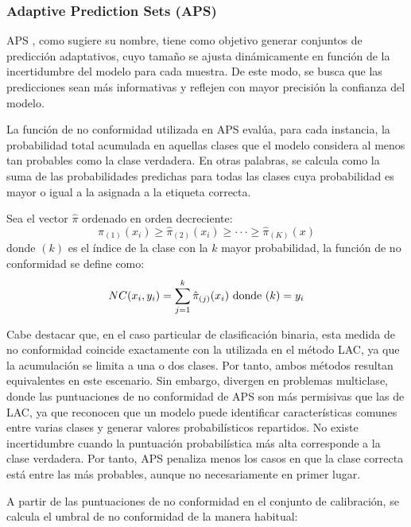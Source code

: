 
\subsubsection{Adaptive Prediction Sets (APS)}

\acrshort{APS} \cite{romano2020}, como sugiere su nombre, tiene como objetivo generar conjuntos de predicción adaptativos, cuyo tamaño se ajusta dinámicamente en función de la incertidumbre del modelo para cada muestra. De este modo, se busca que las predicciones sean más informativas y reflejen con mayor precisión la confianza del modelo.

La función de no conformidad utilizada en \acrshort{APS} evalúa, para cada instancia, la probabilidad total acumulada en aquellas clases que el modelo considera al menos tan probables como la clase verdadera. En otras palabras, se calcula como la suma de las probabilidades predichas para todas las clases cuya probabilidad es mayor o igual a la asignada a la etiqueta correcta.

Sea el vector $\hat{\pi}$ ordenado en orden decreciente: 
$$
\hat{\pi}_{(1)}(x_i) \ge \hat{\pi}_{(2)}(x_i) \ge \cdot\cdot\cdot \ge \hat{\pi}_{(K)}(x)
$$
donde $(k)$ es el índice de la clase con la $k$ mayor probabilidad, la función de no conformidad se define como:
$$
NC(x_i, y_i) = \sum_{j=1}^k \hat{\pi}_{(j)}(x_i) \textnormal{ donde } (k)=y_i 
$$

Cabe destacar que, en el caso particular de clasificación binaria, esta medida de no conformidad coincide exactamente con la utilizada en el método \acrshort{LAC}, ya que la acumulación se limita a una o dos clases. Por tanto, ambos métodos resultan equivalentes en este escenario. Sin embargo, divergen en problemas multiclase, donde las puntuaciones de no conformidad de \acrshort{APS} son más permisivas que las de \acrshort{LAC}, ya que reconocen que un modelo puede identificar características comunes entre varias clases y generar valores probabilísticos repartidos. No existe incertidumbre cuando la puntuación probabilística más alta corresponde a la clase verdadera. Por tanto, \acrshort{APS} penaliza menos los casos en que la clase correcta está entre las más probables, aunque no necesariamente en primer lugar.

A partir de las puntuaciones de no conformidad en el conjunto de calibración, se calcula el umbral de no conformidad de la manera habitual:

